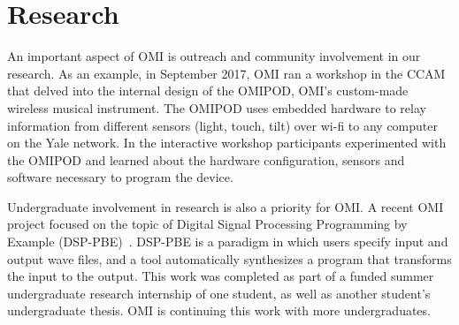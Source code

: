\section{Research}

An important aspect of OMI is outreach and community involvement in our research. As an example, in September 2017, OMI ran a workshop in the CCAM that delved into the internal design of the OMIPOD, OMI's custom-made wireless musical instrument. The OMIPOD uses embedded hardware to relay information from different sensors (light, touch, tilt) over wi-fi to any computer on the Yale network.  In the interactive workshop participants experimented with the OMIPOD and learned about the hardware configuration, sensors and software necessary to program the device.

Undergraduate involvement in research is also a priority for OMI. A recent OMI project focused on the topic of Digital Signal Processing Programming by Example (DSP-PBE)~\cite{SantolucitoFARM}. DSP-PBE is a paradigm in which users specify input and output wave files, and a tool automatically synthesizes a program that transforms the input to the output. This work was completed as part of a funded summer undergraduate research internship of one student, as well as another student's undergraduate thesis. OMI is continuing this work with more undergraduates.

